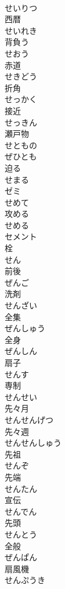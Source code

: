\documentclass[8pt]{extreport}
\begin{document}
\begin{CJK}{UTF8}{min}
\\	せいりつ	
\\	西暦 
\\	せいれき	
\\	背負う 
\\	せおう	
\\	赤道 
\\	せきどう	
\\	折角 
\\	せっかく	
\\	接近 
\\	せっきん	
\\	瀬戸物 
\\	せともの	
\\	ぜひとも	
\\	迫る 
\\	せまる	
\\	ゼミ	
\\	せめて	
\\	攻める 
\\	せめる	
\\	セメント	
\\	栓 
\\	せん	
\\	前後 
\\	ぜんご	
\\	洗剤 
\\	せんざい	
\\	全集 
\\	ぜんしゅう	
\\	全身 
\\	ぜんしん	
\\	扇子 
\\	せんす	
\\	専制 
\\	せんせい	
\\	先々月 
\\	せんせんげつ	
\\	先々週 
\\	せんせんしゅう	
\\	先祖 
\\	せんぞ	
\\	先端 
\\	せんたん	
\\	宣伝 
\\	せんでん	
\\	先頭 
\\	せんとう	
\\	全般 
\\	ぜんぱん	
\\	扇風機 
\\	せんぷうき	

\end{CJK}
\end{document}
